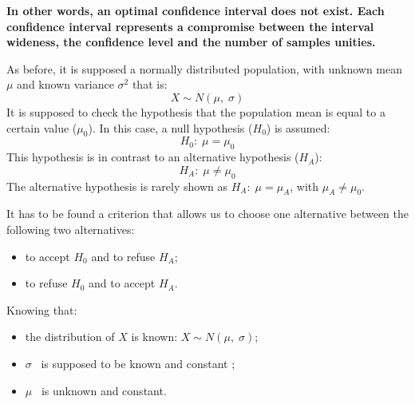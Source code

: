 \begin{frame}
  \vspace*{.5cm}
  \textbf{In other words, an optimal confidence interval does not exist. Each confidence interval represents a compromise between the interval wideness, the confidence level and the number of samples unities.}
\end{frame}




\begin{frame}
  \vspace*{.25cm}
  As before, it is supposed a normally distributed population, with unknown mean $ \mu $ and known variance $ \sigma^2 $ that is:
  $$ X \sim N(\mu,\; \sigma) $$
  It is supposed to check the hypothesis that the population mean is equal to a certain value ($ \mu_0 $). In this case, a null hypothesis ($ H_0 $) is assumed:
  $$ H_0:\; \mu = \mu_0 $$
  This hypothesis is in contrast to an alternative hypothesis ($H_A$):
  $$ H_A:\; \mu \neq \mu_0 $$
 The alternative hypothesis is rarely shown as $ H_A: \; \mu = \mu_A $, with $ \mu_A \neq \mu_0 $.
\end{frame}

\begin{frame}
  \vspace*{.25cm}
  It has to be found a criterion that allows us to choose one alternative between the following two alternatives:
  \vspace*{.25cm}
  \begin{itemize}
    \item to accept $ H_0 $ and to refuse $ H_A $;
    \item to refuse $ H_0 $ and to accept $ H_A $.
  \end{itemize}
  \vspace*{.5cm}
  Knowing that:
  \vspace*{.25cm}
  \begin{itemize}
    \item the distribution of $ X $ is known: $ X\sim N(\mu,\; \sigma) $;
    \vspace*{.25cm}
    \item  $ \sigma $ \ is supposed to be known and constant ;
    \vspace*{.25cm}
    \item $ \mu $ \ is unknown and constant.
  \end{itemize}
\end{frame}

